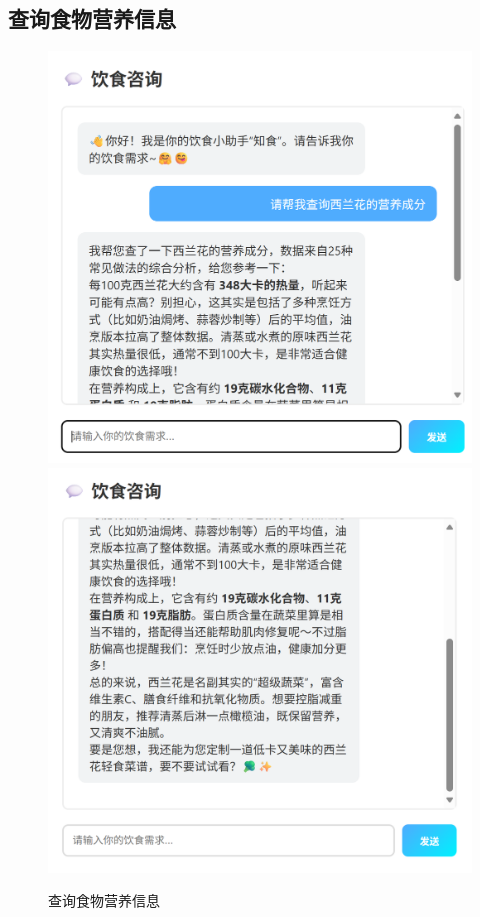 \documentclass[a4paper,UTF8]{ctexart}
\begin{document}
\subsection{查询食物营养信息}
\begin{figure}[H] 
  \centering 
  \includegraphics[width=0.8\linewidth,height=0.42\textheight,keepaspectratio]{1-1.png}\\[1ex] 
  \includegraphics[width=0.8\linewidth,height=0.42\textheight,keepaspectratio]{1-2.png}\\[1ex] 
  \caption{查询食物营养信息} 
  \label{fig:diet_recommend} 
\end{figure}
\end{document}
